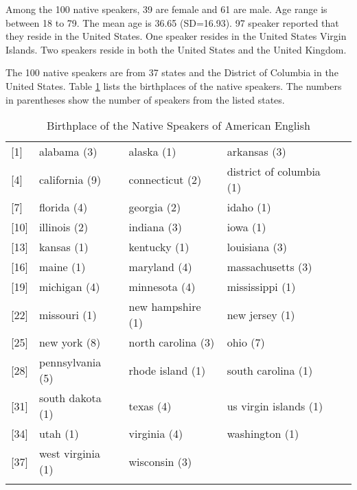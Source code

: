 Among the 100 native speakers, 39 are female and 61 are male. Age range is between 18 to 79. The mean age is 36.65 (SD=16.93). 97 speaker reported that they reside in the United States. One speaker resides in the United States Virgin Islands. Two speakers reside in both the United States and the United Kingdom.

The 100 native speakers are from 37 states and the District of Columbia in the United States. Table \ref{table:bp3} lists the birthplaces of the native speakers. The numbers in parentheses show the number of speakers from the listed states.
\figSpace
\begin{longtable}{lllll}
\caption{Birthplace of the Native Speakers of American English}\\
\hline
{[}1{]}  & alabama (3)       & alaska (1)         & arkansas (3)             \\
{[}4{]}  & california (9)    & connecticut (2)    & district of columbia (1) \\
{[}7{]}  & florida (4)       & georgia (2)        & idaho (1)                \\
{[}10{]} & illinois (2)      & indiana (3)        & iowa (1)                 \\
{[}13{]} & kansas (1)      & kentucky (1)       & louisiana (3)            \\
{[}16{]} & maine (1)         & maryland (4)      & massachusetts (3)        \\
{[}19{]} & michigan (4)     & minnesota (4)     & mississippi (1)          \\
{[}22{]} & missouri (1)      & new hampshire  (1) & new jersey (1)           \\
{[}25{]} & new york (8)      & north carolina (3) & ohio (7)                 \\
{[}28{]} & pennsylvania (5)  & rhode island (1)   & south carolina (1)       \\
{[}31{]} & south dakota (1)  & texas (4)          & us virgin islands  (1)   \\
{[}34{]} & utah (1)          & virginia (4)      & washington (1)           \\
{[}37{]} & west virginia (1) & wisconsin (3)      &      \\
\hline               
\label{table:bp3}
\end{longtable}




